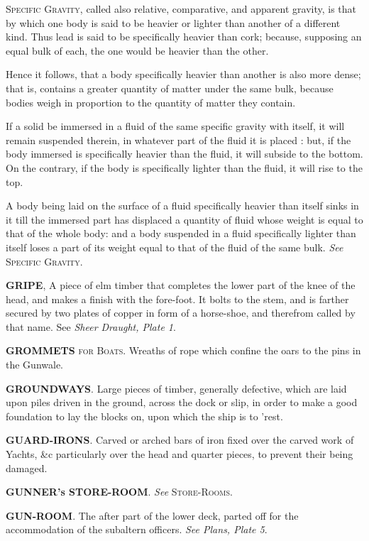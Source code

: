 \textsc{Specific Gravity}, called also relative, comparative, and apparent gravity, is that by which one body is said to be heavier or lighter than another of a different kind. Thus lead is said to be specifically heavier than cork; because, supposing an equal bulk of each, the one would be heavier than the other. 

Hence it follows, that a body specifically heavier than another is also more dense; that is, contains a greater quantity of matter under the same bulk, because bodies weigh in proportion to the quantity of matter they contain. 

If a solid be immersed in a fluid of the same specific gravity with itself, it will remain suspended therein, in whatever part of the fluid it is placed : but, if the body immersed is specifically heavier than the fluid, it will subside to the bottom. On the contrary, if the body is specifically lighter than the fluid, it will rise to the top. 

A body being laid on the surface of a fluid specifically heavier than itself sinks in it till the immersed part has displaced a quantity of fluid whose weight is equal to that of the whole body: and a body suspended in a fluid specifically lighter than itself loses a part of its weight equal to that of the fluid of the same bulk. \textit{See} \textsc{Specific Gravity}. 

\textbf{GRIPE}, A piece of elm timber that completes the lower part of the knee of the head, and makes a finish with the fore-foot. It bolts to the stem, and is farther secured by two plates of copper in form of a horse-shoe, and therefrom called by that name. See \textit{Sheer Draught, Plate 1}.

\textbf{GROMMETS} \textsc{for Boats}. Wreaths of rope which confine the oars to the pins in the Gunwale.

\textbf{GROUNDWAYS}. Large pieces of timber, generally defective, which are laid upon piles driven in the ground, across the dock or slip, in order to make a good foundation to lay the blocks on, upon which the ship is to 'rest. 

\textbf{GUARD-IRONS}. Carved or arched bars of iron fixed over the carved work of Yachts, \&c particularly over the head and quarter pieces, to prevent their being damaged. 

\textbf{GUNNER's STORE-ROOM}. \textit{See} \textsc{Store-Rooms}. 

\textbf{GUN-ROOM}. The after part of the lower deck, parted off for the accommodation of the subaltern officers. \textit{See Plans, Plate 5}. 

